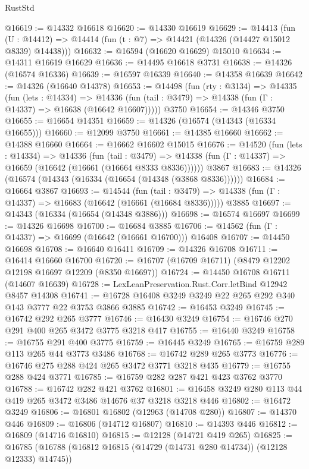 \begin{lexlean}{RustStd}
\begin{coremodule}
@16619 := @14332 @16618
@16620 := @14330 @16619
@16629 := @14413
    (fun (U : @14412) => @14414 (fun (t : @7) => @14421 (@14326 (@14427 @15012 @8339) @14438)))
@16632 := @16594 (@16620 @16629) @15010
@16634 := @14311 @16619 @16629
@16636 := @14495 @16618 @3731
@16638 := @14326 (@16574 @16336)
@16639 := @16597 @16339
@16640 := @14358 @16639
@16642 := @14326 (@16640 @14378)
@16653 := @14498
    (fun (rty : @3134) =>
    @14335
      (fun (lets : @14334) =>
      @14336 (fun (tail : @3479) => @14338 (fun (Γ : @14337) => @16638 (@16642 @16607)))))
    @3750
@16654 := @14346 @3750
@16655 := @16654 @14351
@16659 := @14326 (@16574 (@14343 (@16334 @16655)))
@16660 := @12099 @3750
@16661 := @14385 @16660
@16662 := @14388 @16660
@16664 := @16662 @16602 @15015
@16676 := @14520
    (fun (lets : @14334) =>
    @14336
      (fun (tail : @3479) =>
      @14338 (fun (Γ : @14337) => @16659 (@16642 (@16661 (@16664 @8333 @8336))))))
    @3867
@16683 := @14326 (@16574 (@14343 (@16334 (@16654 (@14348 (@3868 @8336))))))
@16684 := @16664 @3867
@16693 := @14544
    (fun (tail : @3479) => @14338 (fun (Γ : @14337) => @16683 (@16642 (@16661 (@16684 @8336)))))
    @3885
@16697 := @14343 (@16334 (@16654 (@14348 @3886)))
@16698 := @16574 @16697
@16699 := @14326 @16698
@16700 := @16684 @3885
@16706 := @14562 (fun (Γ : @14337) => @16699 (@16642 (@16661 @16700))) @16408
@16707 := @14450 @16698
@16708 := @16640 @16411
@16709 := @14326 @16708
@16711 := @16414 @16660 @16700
@16720 := @16707 (@16709 @16711) (@8479 @12202 @12198 @16697 @12209 (@8350 @16697))
@16724 := @14450 @16708 @16711 (@14607 @16639)
@16728 := LexLeanPreservation.Rust.Corr.letBind @12942 @8457 @14308
@16741 := @16728 @16408 @3249 @3249 @22 @265 @292 @340 @143 @3777 @22 @3753 @3866 @3885
@16742 := @16453 @3249
@16745 := @16742 @292 @265 @3777
@16746 := @16430 @3249
@16754 := @16746 @270 @291 @400 @265 @3472 @3775 @3218 @417
@16755 := @16440 @3249
@16758 := @16755 @291 @400 @3775
@16759 := @16445 @3249
@16765 := @16759 @289 @113 @265 @44 @3773 @3486
@16768 := @16742 @289 @265 @3773
@16776 := @16746 @275 @288 @424 @265 @3472 @3771 @3218 @435
@16779 := @16755 @288 @424 @3771
@16785 := @16759 @282 @287 @421 @423 @3762 @3770
@16788 := @16742 @282 @421 @3762
@16801 := @16458 @3249 @280 @113 @44 @419 @265 @3472 @3486 @14676 @37 @3218 @3218 @446
@16802 := @16472 @3249
@16806 := @16801 @16802 (@12963 (@14708 @280))
@16807 := @14370 @446
@16809 := @16806 (@14712 @16807)
@16810 := @14393 @446
@16812 := @16809 (@14716 @16810)
@16815 := @12128 (@14721 @419 @265)
@16825 := @16785 (@16788 (@16812 @16815 (@14729 (@14731 @280 @14734)) (@12128 @12333) @14745))

\end{coremodule}
\end{lexlean}
